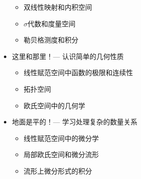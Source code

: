 \documentclass[lang=cn]{zlatex}
\begin{document}
\begin{itemize}
\begin{itemize}
            \item 双线性映射和内积空间
            \item $\sigma$代数和度量空间
            \item 勒贝格测度和积分
        \end{itemize}
    \item 这里和那里！--- 认识简单的几何性质
        \begin{itemize}
            \item 线性赋范空间中函数的极限和连续性
            \item 拓扑空间
            \item 欧氏空间中的几何学
        \end{itemize}
    \item 地面是平的！--- 学习处理复杂的数量关系
        \begin{itemize}
            \item 线性赋范空间中的微分学
            \item 局部欧氏空间和微分流形
            \item 流形上微分形式的积分
        \end{itemize}
\end{itemize}
\end{document}
